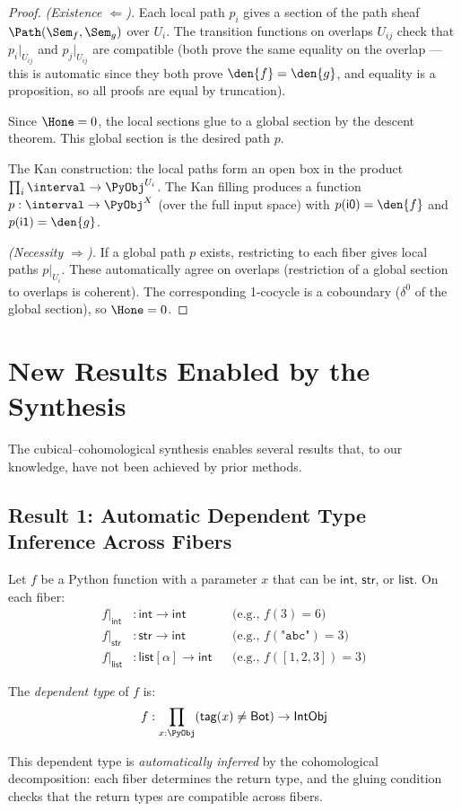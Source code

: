 \begin{proof}
\emph{(Existence $\Leftarrow$).}
Each local path $p_i$ gives a section of the path sheaf
$\Path(\Sem_f, \Sem_g)$ over $U_i$.  The transition functions on
overlaps $U_{ij}$ check that $p_i|_{U_{ij}}$ and $p_j|_{U_{ij}}$
are compatible (both prove the same equality on the overlap --- this
is automatic since they both prove $\den{f} = \den{g}$, and equality
is a proposition, so all proofs are equal by truncation).

Since $\Hone = 0$, the local sections glue to a global section by
the descent theorem.  This global section is the desired path $p$.

The Kan construction: the local paths form an open box in the product
$\prod_i \interval \to \PyObj^{U_i}$.  The Kan filling produces a
function $p : \interval \to \PyObj^X$ (over the full input space)
with $p(\mathsf{i0}) = \den{f}$ and $p(\mathsf{i1}) = \den{g}$.

\emph{(Necessity $\Rightarrow$).}
If a global path $p$ exists, restricting to each fiber gives local
paths $p|_{U_i}$.  These automatically agree on overlaps (restriction
of a global section to overlaps is coherent).  The corresponding
1-cocycle is a coboundary ($\delta^0$ of the global section), so
$\Hone = 0$.
\end{proof}


\chapter{New Results Enabled by the Synthesis}
\label{ch:new-results}

The cubical--cohomological synthesis enables several results that, to
our knowledge, have not been achieved by prior methods.

\section{Result 1: Automatic Dependent Type Inference Across Fibers}

\begin{theorem}
\label{thm:cross-fiber}
Let $f$ be a Python function with a parameter $x$ that can be
$\mathsf{int}$, $\mathsf{str}$, or $\mathsf{list}$.  On each fiber:
\begin{align}
  f|_\mathsf{int} &: \mathsf{int} \to \mathsf{int}
    && \text{(e.g., $f(3) = 6$)} \\
  f|_\mathsf{str} &: \mathsf{str} \to \mathsf{int}
    && \text{(e.g., $f(\texttt{"abc"}) = 3$)} \\
  f|_\mathsf{list} &: \mathsf{list}[\alpha] \to \mathsf{int}
    && \text{(e.g., $f([1,2,3]) = 3$)}
\end{align}

The \emph{dependent type} of $f$ is:
\[
  f : \prod_{x : \PyObj} (\mathsf{tag}(x) \neq \mathsf{Bot}) \to
  \mathsf{IntObj}
\]

This dependent type is \emph{automatically inferred} by the
cohomological decomposition: each fiber determines the return type,
and the gluing condition checks that the return types are compatible
across fibers.
\end{theorem}

